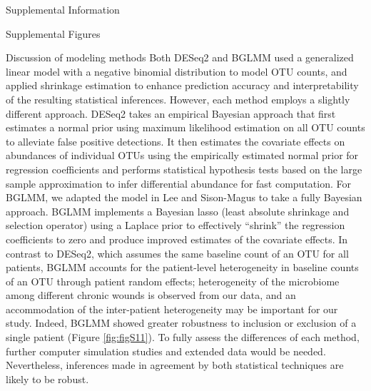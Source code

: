 \documentclass[oneside,12pt,final]{sty/ucthesis-CA2012}
\begin{document}
\begin{mainmatter}
\begin{section}{Supplemental Information}
\begin{subsection}{Supplemental Figures}
\end{subsection}

\clearpage
\begin{subsection}{Discussion of modeling methods}
\label{TextA1}
Both DESeq2 and BGLMM used a generalized linear model with a negative binomial distribution to model OTU counts, and applied shrinkage estimation to enhance prediction accuracy and interpretability of the resulting statistical inferences. However, each method employs a slightly different approach. DESeq2 takes an empirical Bayesian approach that first estimates a normal prior using maximum likelihood estimation on all OTU counts to alleviate false positive detections. It then estimates the covariate effects on abundances of individual OTUs using the empirically estimated normal prior for regression coefficients and performs statistical hypothesis tests based on the large sample approximation to infer differential abundance for fast computation. For BGLMM, we adapted the model in Lee and Sison-Magus \cite{RN33} to take a fully Bayesian approach. BGLMM implements a Bayesian lasso (least absolute shrinkage and selection operator) using a Laplace prior to effectively “shrink” the regression coefficients to zero and produce improved estimates of the covariate effects. In contrast to DESeq2, which assumes the same baseline count of an OTU for all patients, BGLMM accounts for the patient-level heterogeneity in baseline counts of an OTU through patient random effects; heterogeneity of the microbiome among different chronic wounds is observed from our data, and an accommodation of the inter-patient heterogeneity may be important for our study. Indeed, BGLMM showed greater robustness to inclusion or exclusion of a single patient (Figure \ref{fig:figS11}). To fully assess the differences of each method, further computer simulation studies and extended data would be needed. Nevertheless, inferences made in agreement by both statistical techniques are likely to be robust.
\end{subsection}


\end{section}


\end{mainmatter}
\end{document}
